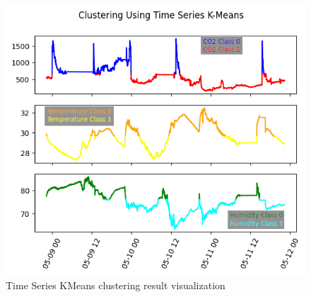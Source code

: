 \begin{figure}
    \centerline{\includegraphics[scale=0.65]{resources/iot-clustering.png}}
    \caption{Time Series KMeans clustering result visualization}
    \label{kmeans}
\end{figure}
